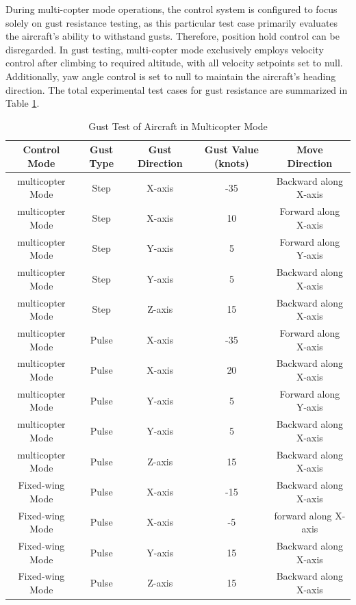 During multi-copter mode operations, the control system is configured to focus solely on gust resistance testing, as this particular test case primarily evaluates the aircraft's ability to withstand gusts. Therefore, position hold control can be disregarded. In gust testing, multi-copter mode exclusively employs velocity control after climbing to required altitude, with all velocity setpoints set to null. Additionally, yaw angle control is set to null to maintain the aircraft's heading direction. The total experimental test cases for gust resistance are summarized in Table \ref{tab:gust VTOL}.

\begin{table}
    \centering
    \begin{tabular}{ccccc}
    \hline
        Control Mode & Gust Type & Gust Direction & Gust Value (knots) & Move Direction \\
        \hline
        multicopter Mode & Step & X-axis & -35 & Backward along X-axis \\
        multicopter Mode & Step & X-axis & 10 & Forward along X-axis \\
        multicopter Mode & Step & Y-axis & 5 & Forward along Y-axis \\
        multicopter Mode & Step & Y-axis & 5 & Backward along X-axis \\
        multicopter Mode & Step & Z-axis & 15 & Backward along X-axis \\
        \hline
        multicopter Mode & Pulse & X-axis & -35 & Forward along X-axis \\
        multicopter Mode & Pulse & X-axis & 20 & Backward along X-axis \\
        multicopter Mode & Pulse & Y-axis & 5 & Forward along Y-axis \\
        multicopter Mode & Pulse & Y-axis & 5 & Backward along X-axis \\
        multicopter Mode & Pulse & Z-axis & 15 & Backward along X-axis \\
        \hline
        Fixed-wing Mode & Pulse & X-axis & -15 & Backward along X-axis \\
        Fixed-wing Mode & Pulse & X-axis & -5 & forward along X-axis \\
        Fixed-wing Mode & Pulse & Y-axis & 15 & Backward along X-axis \\
        Fixed-wing Mode & Pulse & Z-axis & 15 & Backward along X-axis \\
    \hline
    \end{tabular}
    \caption{Gust Test of Aircraft in Multicopter Mode}
    \label{tab:gust VTOL}
\end{table}

